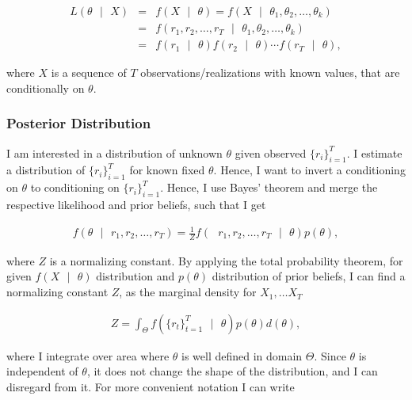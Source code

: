 \documentclass[a4paper,11pt,english]{article}
\begin{document}
			\begin{eqnarray*}
				L(\theta \text{ } | \text{ }X) &=& f(X\text{ }|\text{ }\theta) =  f(X\text{ }|\text{ }\theta_1, \theta_2,\ldots, \theta_k) \\
				&=& f(r_1, r_2,\ldots, r_T \text{ }|\text{ } \theta_1, \theta_2,\ldots,\theta_k) \\
				&=& f(r_1 \text{ }|\text{ } \theta) f(r_2 \text{ }|\text{ } \theta)\cdots f(r_T \text{ }|\text{ } \theta),
			\end{eqnarray*}	 
	
			\noindent where $X$ is a sequence of $T$ observations/realizations with known values, that are conditionally on $\theta$. 

			
			\subsubsection{Posterior Distribution}

	
			I am interested in a distribution of unknown $\theta$ given observed $\{r_i\}_{i=1}^T$. I estimate a distribution of $\{r_i\}_{i=1}^T$ for 				known fixed $\theta$. Hence, I want to invert a conditioning on $\theta$ to conditioning on $\{r_i\}_{i=1}^T$. Hence, I use Bayes' theorem 
			and merge the respective likelihood and prior beliefs, such that I get 
		
			\begin{eqnarray*}
				f(\theta \text{ } | \text{ }r_1, r_2,\ldots, r_T) = \frac{1}{Z}f(\text{ }r_1, r_2,\ldots, r_T \text{ } | \text{ } \theta)p(\theta),
			\end{eqnarray*}	 
			
			\noindent where $Z$ is  a normalizing constant. By applying the total probability theorem, for given $f(X\text{ }|\text{ }\theta)$ 
			distribution and $p(\theta)$ distribution of prior beliefs, I can find a normalizing constant $Z$, as the marginal density for 
			$X_1,\ldots X_T$

			\begin{eqnarray*}
				Z = \int_\Theta f(\{r_t\}_{t=1}^T \text{ }|\text{ }\theta)p(\theta)d(\theta),
			\end{eqnarray*}	 
	 		
	 		\noindent where I integrate over area where $\theta$ is well defined in domain $\Theta$. Since $\theta$ is independent of $\theta$, it 
	 		does not change the shape of the distribution, and I can disregard from it. For more convenient notation I can write 
	 		
\end{document}
